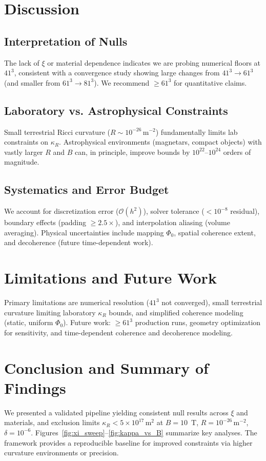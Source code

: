 \documentclass[10pt,twocolumn]{article}
\begin{document}
\section{Discussion}
\subsection{Interpretation of Nulls}
The lack of $\xi$ or material dependence indicates we are probing numerical floors at $41^3$, consistent with a convergence study showing large changes from $41^3\to61^3$ (and smaller from $61^3\to81^3$). We recommend $\ge 61^3$ for quantitative claims.

\subsection{Laboratory vs. Astrophysical Constraints}
Small terrestrial Ricci curvature ($R\sim10^{-26}\,\mathrm{m^{-2}}$) fundamentally limits lab constraints on $\kappa_R$. Astrophysical environments (magnetars, compact objects) with vastly larger $R$ and $B$ can, in principle, improve bounds by $10^{22}$--$10^{24}$ orders of magnitude.

\subsection{Systematics and Error Budget}
We account for discretization error ($\mathcal{O}(h^2)$), solver tolerance ($<10^{-8}$ residual), boundary effects (padding $\ge 2.5\times$), and interpolation aliasing (volume averaging). Physical uncertainties include mapping $\Phi_0$, spatial coherence extent, and decoherence (future time-dependent work).

\section{Limitations and Future Work}
Primary limitations are numerical resolution ($41^3$ not converged), small terrestrial curvature limiting laboratory $\kappa_R$ bounds, and simplified coherence modeling (static, uniform $\Phi_0$). Future work: $\ge 61^3$ production runs, geometry optimization for sensitivity, and time-dependent coherence and decoherence modeling.

\section{Conclusion and Summary of Findings}
We presented a validated pipeline yielding consistent null results across $\xi$ and materials, and exclusion limits $\kappa_R < 5\times10^{17}\,\mathrm{m^2}$ at $B=10$~T, $R=10^{-26}\,\mathrm{m^{-2}}$, $\delta=10^{-6}$. Figures~\ref{fig:xi_sweep}--\ref{fig:kappa_vs_B} summarize key analyses. The framework provides a reproducible baseline for improved constraints via higher curvature environments or precision.
\end{document}
